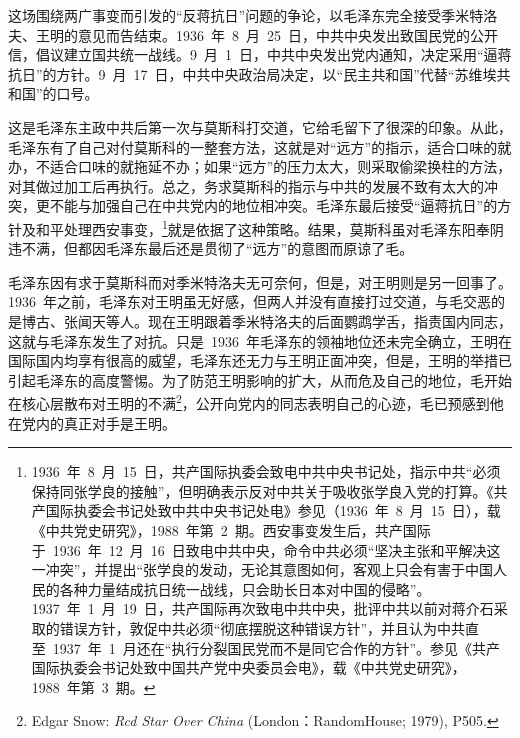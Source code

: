 这场围绕两广事变而引发的“反蒋抗日”问题的争论，以毛泽东完全接受季米特洛夫、王明的意见而告结束。1936~年~8~月~25~日，中共中央发出致国民党的公开信，倡议建立国共统一战线。9~月~1~日，中共中央发出党内通知，决定采用“逼蒋抗日”的方针。9~月~17~日，中共中央政治局决定，以“民主共和国”代替“苏维埃共和国”的口号。

这是毛泽东主政中共后第一次与莫斯科打交道，它给毛留下了很深的印象。从此，毛泽东有了自己对付莫斯科的一整套方法，这就是对“远方”的指示，适合口味的就办，不适合口味的就拖延不办；如果“远方”的压力太大，则采取偷梁换柱的方法，对其做过加工后再执行。总之，务求莫斯科的指示与中共的发展不致有太大的冲突，更不能与加强自己在中共党内的地位相冲突。毛泽东最后接受“逼蒋抗日”的方针及和平处理西安事变，\footnote{1936~年~8~月~15~日，共产国际执委会致电中共中央书记处，指示中共“必须保持同张学良的接触”，但明确表示反对中共关于吸收张学良入党的打算。《共产国际执委会书记处致中共中央书记处电》参见（1936~年~8~月~15~日），载《中共党史研究》，1988~年第~2~期。西安事变发生后，共产国际于~1936~年~12~月~16~日致电中共中央，命令中共必须“坚决主张和平解决这一冲突”，并提出“张学良的发动，无论其意图如何，客观上只会有害于中国人民的各种力量结成抗日统一战线，只会助长日本对中国的侵略”。1937~年~1~月~19~日，共产国际再次致电中共中央，批评中共以前对蒋介石采取的错误方针，敦促中共必须“彻底摆脱这种错误方针”，并且认为中共直至~1937~年~1~月还在“执行分裂国民党而不是同它合作的方针”。参见《共产国际执委会书记处致中国共产党中央委员会电》，载《中共党史研究》，1988~年第~3~期。}就是依据了这种策略。结果，莫斯科虽对毛泽东阳奉阴违不满，但都因毛泽东最后还是贯彻了“远方”的意图而原谅了毛。

毛泽东因有求于莫斯科而对季米特洛夫无可奈何，但是，对王明则是另一回事了。1936~年之前，毛泽东对王明虽无好感，但两人并没有直接打过交道，与毛交恶的是博古、张闻天等人。现在王明跟着季米特洛夫的后面鹦鹉学舌，指责国内同志，这就与毛泽东发生了对抗。只是~1936~年毛泽东的领袖地位还未完全确立，王明在国际国内均享有很高的威望，毛泽东还无力与王明正面冲突，但是，王明的举措已引起毛泽东的高度警惕。为了防范王明影响的扩大，从而危及自己的地位，毛开始在核心层散布对王明的不满\footnote{Edgar Snow: \textit{Rcd Star Over China} (London：RandomHouse; 1979), P505.}，公开向党内的同志表明自己的心迹，毛已预感到他在党内的真正对手是王明。